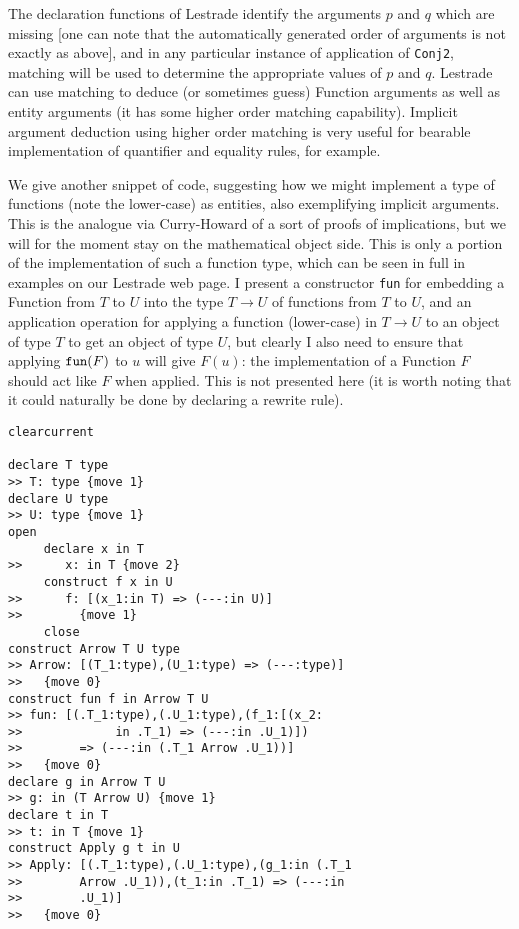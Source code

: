 \documentclass{article}
\begin{document}
The declaration functions of Lestrade identify the arguments $p$ and $q$ which are missing [one can note that the automatically generated order of arguments is not exactly as above], and in any particular instance of application of {\tt Conj2}, matching will be used to determine the appropriate values of $p$ and $q$.  Lestrade can use matching to deduce (or sometimes guess) Function arguments as well as entity arguments (it has some higher order matching capability).  Implicit argument deduction using higher order matching is very useful for bearable implementation of quantifier and equality rules, for example.

 We give another snippet of code, suggesting how we might implement a type of functions (note the lower-case) as entities, also exemplifying implicit arguments.  This is the analogue via Curry-Howard of a sort of proofs of implications, but we will for the moment stay on  the mathematical object side.  This is only a portion of the implementation of such a function type, which can be seen in full in examples on our Lestrade web page.  I present a constructor {\tt fun} for embedding a Function from $T$ to $U$ into the type $T \rightarrow U$ of functions from $T$ to $U$, and an application operation for applying a function (lower-case) in $T \rightarrow U$ to an object of type $T$ to get an object of type $U$, but clearly I also need to ensure that applying ${\tt fun}(F)$ to $u$ will give $F(u)$:  the  implementation of a Function $F$ should act like $F$ when applied.  This is not presented here (it is worth noting that it could naturally be done by declaring a rewrite rule).
\begin{verbatim}
clearcurrent

declare T type
>> T: type {move 1}
declare U type
>> U: type {move 1}
open
     declare x in T
>>      x: in T {move 2}
     construct f x in U
>>      f: [(x_1:in T) => (---:in U)]
>>        {move 1}
     close
construct Arrow T U type
>> Arrow: [(T_1:type),(U_1:type) => (---:type)]
>>   {move 0}
construct fun f in Arrow T U
>> fun: [(.T_1:type),(.U_1:type),(f_1:[(x_2:
>>             in .T_1) => (---:in .U_1)])
>>        => (---:in (.T_1 Arrow .U_1))]
>>   {move 0}
declare g in Arrow T U
>> g: in (T Arrow U) {move 1}
declare t in T
>> t: in T {move 1}
construct Apply g t in U
>> Apply: [(.T_1:type),(.U_1:type),(g_1:in (.T_1 
>>        Arrow .U_1)),(t_1:in .T_1) => (---:in 
>>        .U_1)]
>>   {move 0}
\end{verbatim}
\end{document}
